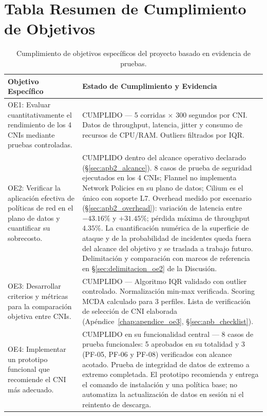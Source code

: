 \section{Tabla Resumen de Cumplimiento de Objetivos}

\begin{table}[htbp]
\centering
\scriptsize
\caption{Cumplimiento de objetivos específicos del proyecto basado en evidencia de pruebas.}
\label{tab:cumplimiento-objetivos}
\begin{tabularx}{\textwidth}{|Y|Y|}
\hline
\textbf{Objetivo Específico} & \textbf{Estado de Cumplimiento y Evidencia} \\
\hline
OE1: Evaluar cuantitativamente el rendimiento de los 4 CNIs mediante pruebas controladas. & CUMPLIDO --- 5 corridas $\times$ 300 segundos por CNI. Datos de throughput, latencia, jitter y consumo de recursos de CPU/RAM. Outliers filtrados por IQR. \\
\hline
OE2: Verificar la aplicación efectiva de políticas de red en el plano de datos y cuantificar su sobrecosto. & CUMPLIDO dentro del alcance operativo declarado (\S\ref{sec:apb2_alcance}). 8 casos de prueba de seguridad ejecutados en los 4 CNIs; Flannel no implementa Network Policies en su plano de datos; Cilium es el único con soporte L7. Overhead medido por escenario (\S\ref{sec:apb2_overhead}): variación de latencia entre $-43.16\%$ y $+31.45\%$; pérdida máxima de throughput $4.35\%$. La cuantificación numérica de la superficie de ataque y de la probabilidad de incidentes queda fuera del alcance del objetivo y se traslada a trabajo futuro. Delimitación y comparación con marcos de referencia en \S\ref{sec:delimitacion_oe2} de la Discusión. \\
\hline
OE3: Desarrollar criterios y métricas para la comparación objetiva entre CNIs. & CUMPLIDO --- Algoritmo IQR validado con outlier controlado. Normalización min-max verificada. Scoring MCDA calculado para 3 perfiles. Lista de verificación de selección de CNI elaborada (Apéndice~\ref{chap:apendice_oe3}, \S\ref{sec:apb_checklist}). \\
\hline
OE4: Implementar un prototipo funcional que recomiende el CNI más adecuado. & CUMPLIDO en su funcionalidad central --- 8 casos de prueba funcionales: 5 aprobados en su totalidad y 3 (PF-05, PF-06 y PF-08) verificados con alcance acotado. Prueba de integridad de datos de extremo a extremo completada. El prototipo recomienda y entrega el comando de instalación y una política base; no automatiza la actualización de datos en sesión ni el reintento de descarga. \\
\hline
\end{tabularx}
\end{table}


